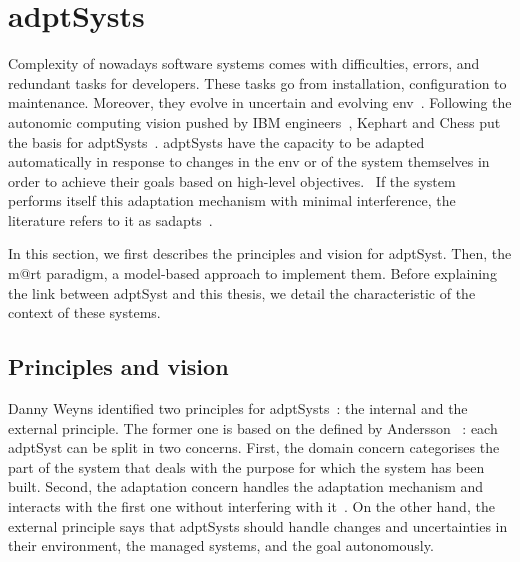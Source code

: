 \section[Adaptive systems]{\Glspl{adptSyst}}
\label{sec:back:adapt-syst}

Complexity of nowadays software systems comes with difficulties, errors, and redundant tasks for developers.
These tasks go from installation, configuration to maintenance.
Moreover, they evolve in uncertain and evolving \gls{env}~\cite{DBLP:conf/dagstuhl/EsfahaniM10}.
Following the autonomic computing vision pushed by IBM engineers~\cite{computing2006architectural}, Kephart and Chess put the basis for \glspl{adptSyst}~\cite{DBLP:journals/computer/KephartC03}.
\Glspl{adptSyst} have the capacity to be adapted automatically in response to changes in the \gls{env} or of the system themselves in order to achieve their goals based on high-level objectives.~\cite{DBLP:conf/dagstuhl/ChengLGIMABBBCSDFGGGKKKLMMMPSTTWW09}
If the system performs itself this adaptation mechanism with minimal interference, the literature refers to it as \glspl{sadapt}~\cite{DBLP:conf/dagstuhl/BrunSGGKLMPS09}.

In this section, we first describes the principles and vision for \gls{adptSyst}.
Then, the \gls{m@rt} paradigm, a model-based approach to implement them.
Before explaining the link between \gls{adptSyst} and this thesis, we detail the characteristic of the context of these systems.


\subsection{Principles and vision}

Danny Weyns	identified two principles for \glspl{adptSyst}~\cite{DBLP:books/sp/19/Weyns19}: the internal and the external principle.
The former one is based on the  defined by Andersson \etal ~\cite{DBLP:conf/icse/AnderssonLMW09}: each \gls{adptSyst} can be split in two concerns.
First, the domain concern categorises the part of the system that deals with the purpose for which the system has been built.
Second, the adaptation concern handles the adaptation mechanism and interacts with the first one without interfering with it~\cite{DBLP:journals/tse/KramerM90}.
On the other hand, the external principle says that \glspl{adptSyst} should handle changes and uncertainties in their environment, the managed systems, and the goal autonomously.

